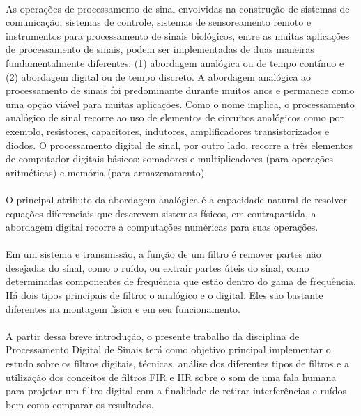 \documentclass[12pt,fleqn]{article}
\begin{document}
\paragraph{} As operações de processamento de sinal envolvidas na construção de sistemas de comunicação, sistemas de controle, sistemas de sensoreamento remoto e instrumentos para processamento de sinais biológicos, entre as muitas aplicações de processamento de sinais, podem ser implementadas de duas maneiras fundamentalmente diferentes: (1) abordagem analógica ou de tempo contínuo e (2) abordagem digital ou de tempo discreto. A abordagem analógica ao processamento de sinais foi predominante durante muitos anos e permanece como uma opção viável para muitas aplicações. Como o nome implica, o processamento analógico de sinal recorre ao uso de elementos de circuitos analógicos como por exemplo, resistores, capacitores, indutores, amplificadores transistorizados e diodos. O processamento digital de sinal, por outro lado, recorre a três elementos de computador digitais básicos: somadores e multiplicadores (para operações aritméticas) e memória (para armazenamento).

\paragraph{} O principal atributo da abordagem analógica é a capacidade natural de resolver equações diferenciais que descrevem sistemas físicos, em contrapartida, a abordagem digital recorre a computações numéricas para suas operações.

\paragraph{} Em um sistema e transmissão, a função de um filtro é remover partes não desejadas do sinal, como o ruído, ou extrair partes úteis do sinal, como determinadas componentes de frequência que estão dentro do gama de frequência. Há dois tipos principais de filtro: o analógico e o digital. Eles são bastante diferentes na montagem física e em seu funcionamento.

\paragraph{} A partir dessa breve introdução, o presente trabalho da disciplina de Processamento Digital de Sinais terá como objetivo principal implementar o estudo sobre os filtros digitais, técnicas, análise dos diferentes tipos de filtros e a utilização dos conceitos de filtros FIR e IIR sobre o som de uma fala humana para projetar um filtro digital com a finalidade de retirar interferências e ruídos bem como comparar os resultados.
\end{document}
